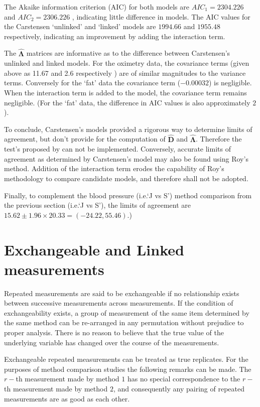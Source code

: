 \documentclass[12pt, a4paper]{report}
\theoremstyle{plain}
\theoremstyle{definition}
\theoremstyle{remark}
\begin{document}
	The Akaike information criterion (AIC) for both models are $AIC_{1} = 2304.226$ and $AIC_{2} = 2306.226$ , indicating little difference in models. The AIC values for the Carstensen `unlinked' and `linked' models are $1994.66$ and $1955.48$ respectively, indicating an improvement by adding the interaction term.
	
	The $\boldsymbol{\hat{\Lambda}}$ matrices are informative as to the difference between Carstensen's unlinked and linked models. For the oximetry data, the covariance terms (given above as 11.67 and 2.6 respectively ) are of similar magnitudes to the variance terms. Conversely for the `fat' data the covariance term ($-0.00032$) is negligible. When the interaction term is added to the model, the covariance term remains negligible. (For the `fat' data, the difference in AIC values is also approximately $2$).
	
	To conclude, Carstensen's models provided a rigorous way to determine limits of agreement, but don't provide for the computation of $\boldsymbol{\hat{D}}$ and $\boldsymbol{\hat{\Lambda}}$. Therefore the test's proposed by \citet{roy} can not be implemented. Conversely, accurate limits of agreement as determined by Carstensen's model may also be found using Roy's method. Addition of the interaction term erodes the capability of Roy's methodology to compare candidate models, and therefore shall not be adopted.
	
	Finally, to complement the blood pressure (i.e.`J vs S') method comparison from the previous section (i.e.`J vs S'), the limits of agreement are $15.62 \pm 1.96 \times 20.33 = (-24.22, 55.46)$.)
	\newpage
	
	\section{Exchangeable and Linked measurements}
	
	
	Repeated measurements are said to be exchangeable if no relationship exists between successive measurements across measurements. If the condition of exchangeability exists, a group of measurement of the same item determined by the same method can be re-arranged in any permutation without prejudice to proper analysis. There is no reason to believe that the true value of the underlying variable has changed over the course of the measurements.

	Exchangeable repeated measurements can be treated as true replicates. For the purposes of method comparison studies the following remarks can be made. The $r-$th measurement made by method $1$ has no special correspondence to the $r-$th measurement made by method $2$, and consequently any pairing of repeated measurements are as good as each other.
	
\end{document}
